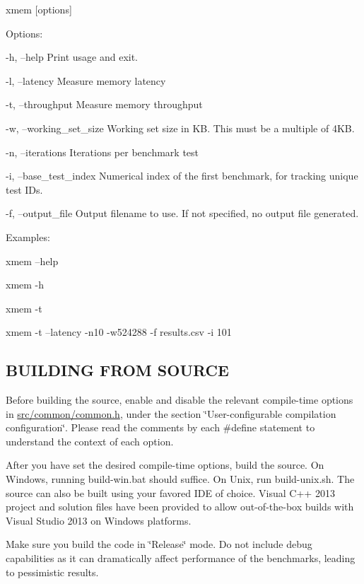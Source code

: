 xmem \mbox{[}options\mbox{]}

Options\+: \begin{DoxyVerb}-h, --help                Print usage and exit.

-l, --latency             Measure memory latency

-t, --throughput          Measure memory throughput

-w, --working_set_size    Working set size in KB. This must be a multiple of
                          4KB.

-n, --iterations          Iterations per benchmark test

-i, --base_test_index     Numerical index of the first benchmark, for
                          tracking unique test IDs.

-f, --output_file         Output filename to use. If not specified, no
                          output file generated.
\end{DoxyVerb}


Examples\+: \begin{DoxyVerb}xmem --help

xmem -h

xmem -t

xmem -t --latency -n10 -w524288 -f results.csv -i 101
\end{DoxyVerb}




 \subsection*{B\+U\+I\+L\+D\+I\+N\+G F\+R\+O\+M S\+O\+U\+R\+C\+E }

Before building the source, enable and disable the relevant compile-\/time options in \hyperlink{common_8h}{src/common/common.\+h}, under the section \char`\"{}\+User-\/configurable compilation configuration\char`\"{}. Please read the comments by each \#define statement to understand the context of each option.

After you have set the desired compile-\/time options, build the source. On Windows, running build-\/win.\+bat should suffice. On Unix, run build-\/unix.\+sh. The source can also be built using your favored I\+D\+E of choice. Visual C++ 2013 project and solution files have been provided to allow out-\/of-\/the-\/box builds with Visual Studio 2013 on Windows platforms.

Make sure you build the code in \char`\"{}\+Release\char`\"{} mode. Do not include debug capabilities as it can dramatically affect performance of the benchmarks, leading to pessimistic results. 

